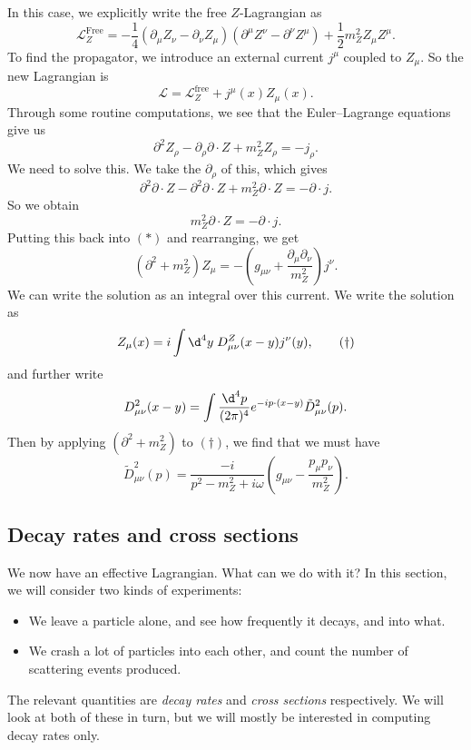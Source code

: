 \documentclass[a4paper]{article}
\begin{document}
In this case, we explicitly write the free $Z$-Lagrangian as
\[
  \mathcal{L}^{\mathrm{Free}}_Z = - \frac{1}{4}(\partial_\mu Z_\nu - \partial_\nu Z_\mu) (\partial^\mu Z^\nu - \partial^\nu Z^\mu) + \frac{1}{2} m_Z^2 Z_\mu Z^\mu.
\]
To find the propagator, we introduce an external current $j^\mu$ coupled to $Z_\mu$. So the new Lagrangian is
\[
  \mathcal{L} = \mathcal{L}_Z^{\mathrm{free}} + j^\mu (x) Z_\mu(x).
\]
Through some routine computations, we see that the Euler--Lagrange equations give us
\[
  \partial^2 Z_\rho - \partial_\rho \partial \cdot Z + m_Z^2 Z_\rho = -j_\rho.\tag{$*$}
\]
We need to solve this. We take the $\partial_\rho$ of this, which gives
\[
  \partial^2 \partial\cdot Z - \partial^2 \partial \cdot Z + m_Z^2 \partial \cdot Z =- \partial \cdot j.
\]
So we obtain
\[
  m_Z^2 \partial \cdot Z = - \partial \cdot j.
\]
Putting this back into $(*)$ and rearranging, we get
\[
  (\partial^2 + m_Z^2) Z_\mu = - \left(g_{\mu\nu} + \frac{\partial_\mu\partial_\nu}{m_Z^2}\right)j^\nu.
\]
We can write the solution as an integral over this current. We write the solution as %
\[
  Z_\mu(x) = i \int \d^4 y\; D_{\mu\nu}^Z(x - y)j^\nu(y),\tag{$\dagger$}
\]
and further write
\[
  D_{\mu\nu}^2 (x - y) = \int \frac{\d^4 p}{(2\pi)^4} e^{-ip\cdot (x - y)} \tilde{D}_{\mu\nu}^2(p).
\]
Then by applying $(\partial^2 + m_Z^2)$ to $(\dagger)$, we find that we must have
\[
  \tilde{D}_{\mu\nu}^2(p) = \frac{-i}{p^2 - m_Z^2 + i \omega}\left(g_{\mu\nu} - \frac{p_\mu p_\nu}{m_Z^2}\right).
\]
\subsection{Decay rates and cross sections}
We now have an effective Lagrangian. What can we do with it? In this section, we will consider two kinds of experiments:
\begin{itemize}
  \item We leave a particle alone, and see how frequently it decays, and into what.
  \item We crash a lot of particles into each other, and count the number of scattering events produced.
\end{itemize}
The relevant quantities are \emph{decay rates} and \emph{cross sections} respectively. We will look at both of these in turn, but we will mostly be interested in computing decay rates only.
\end{document}
